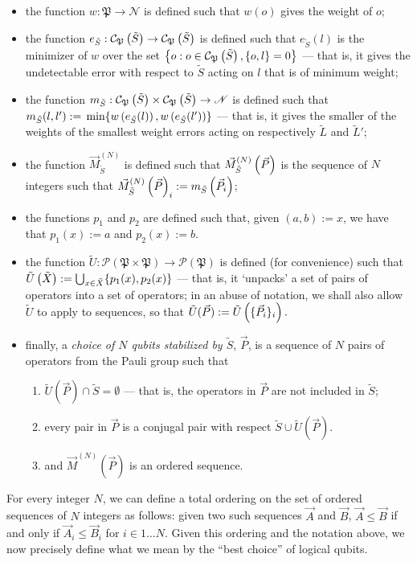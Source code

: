 \documentclass[twocolumn,showpacs,preprintnumbers,amsmath,amssymb,nofootinbib,pra,floatfix]{revtex4-1}
\newenvironment{definition}[1][Definition]{\begin{trivlist}
\item[\hskip \labelsep {\bfseries #1}]}{\end{trivlist}}
\newcommand{\lst}{\vec}
\newcommand{\set}{\tilde}
\newcommand{\pauligroup}{\mathfrak{P}}
\newcommand{\powerset}{\mathcal{P}}
\newcommand{\centralizer}{\mathcal{C}}
\begin{document}
\begin{definition}

\begin{itemize}
\item the function $w:\pauligroup\to \mathscr{N}$ is defined such that $w(o)$ gives the weight of $o$;
\item the function $e_{\set S}:\centralizer_\pauligroup\paren{\set S}\to \centralizer_\pauligroup\paren{\set S}$ is defined such that $e_{\set S}(l)$ is the minimizer of $w$ over the set $\left\{o: o\in \centralizer_\pauligroup\paren{\set S}, \{o,l\}=0\right\}$ --- that is, it gives the undetectable error with respect to $\set S$ acting on $l$ that is of minimum weight;
\item the function $m_{\set S}:\centralizer_\pauligroup\paren{\set S}\times \centralizer_\pauligroup\paren{\set S} \to \mathscr{N}$ is defined such that $m_{\set S}(l,l'):=\min \{w\paren{e_{\set S}(l)},w\paren{e_{\set S}(l')}\}$ --- that is, it gives the smaller of the weights of the smallest weight errors acting on respectively $\set L$ and $\set L'$;
\item the function $\vec M^{(N)}_{\set S}$ is defined such that $\vec M^{(N)}_{\set S}\paren{\vec P}$ is the sequence of $N$ integers such that $\vec M^{(N)}_{\set S}\paren{\vec P}_i := m_{\set S}\paren{\vec P_i}$;
\item the functions $p_1$ and $p_2$ are defined such that, given $(a,b):=x$, we have that $p_1(x):=a$ and $p_2(x):=b$.
\item the function $\set U:\powerset(\pauligroup\times\pauligroup)\to\powerset(\pauligroup)$ is defined (for convenience) such that $\set U\paren{\set X}:=\bigcup_{x\in\set X} \{p_1(x),p_2(x)\}$ --- that is, it `unpacks' a set of pairs of operators into a set of operators;  in an abuse of notation, we shall also allow $\set U$ to apply to sequences, so that $\set U(\lst P) := \set U\paren{\{\lst P_i\}_i}.$
\item finally, a \emph{choice of $N$ qubits stabilized by $\set S$}, $\lst P$, is a sequence of $N$ pairs of operators from the Pauli group such that 
\begin{enumerate}
\item $\set U(\lst P)\cap \set S = \emptyset$ --- that is, the operators in $\lst P$ are not included in $\set S$;
\item every pair in $\lst P$ is a conjugal pair with respect $\set S \cup \set U(\lst P)$.
\item and $\lst M^{(N)}(\lst P)$ is an ordered sequence.
\end{enumerate}
\end{itemize}

\end{definition}
For every integer $N$, we can define a total ordering on the set of ordered sequences of $N$ integers as follows:  given two such sequences $\lst A$ and $\lst B$, $\lst A \le \lst B$ if and only if $\lst A_i \le \lst B_i$ for $i \in 1\dots N$.  Given this ordering and the notation above, we now precisely define what we mean by the ``best choice'' of logical qubits.
\end{document}
